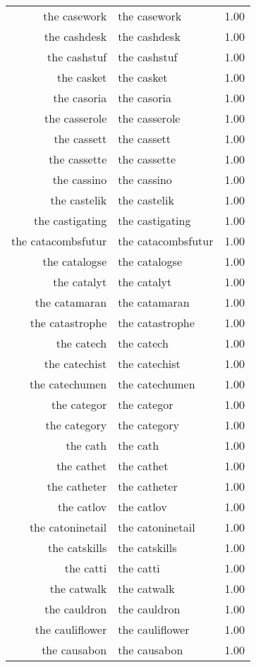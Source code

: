 \begin{table}[ht]
\begin{tabular}{rlr}
  the casework & the casework & 1.00 \\ 
  the cashdesk & the cashdesk & 1.00 \\ 
  the cashstuf & the cashstuf & 1.00 \\ 
  the casket & the casket & 1.00 \\ 
  the casoria & the casoria & 1.00 \\ 
  the casserole & the casserole & 1.00 \\ 
  the cassett & the cassett & 1.00 \\ 
  the cassette & the cassette & 1.00 \\ 
  the cassino & the cassino & 1.00 \\ 
  the castelik & the castelik & 1.00 \\ 
  the castigating & the castigating & 1.00 \\ 
  the catacombsfutur & the catacombsfutur & 1.00 \\ 
  the catalogse & the catalogse & 1.00 \\ 
  the catalyt & the catalyt & 1.00 \\ 
  the catamaran & the catamaran & 1.00 \\ 
  the catastrophe & the catastrophe & 1.00 \\ 
  the catech & the catech & 1.00 \\ 
  the catechist & the catechist & 1.00 \\ 
  the catechumen & the catechumen & 1.00 \\ 
  the categor & the categor & 1.00 \\ 
  the category & the category & 1.00 \\ 
  the cath & the cath & 1.00 \\ 
  the cathet & the cathet & 1.00 \\ 
  the catheter & the catheter & 1.00 \\ 
  the catlov & the catlov & 1.00 \\ 
  the catoninetail & the catoninetail & 1.00 \\ 
  the catskills & the catskills & 1.00 \\ 
  the catti & the catti & 1.00 \\ 
  the catwalk & the catwalk & 1.00 \\ 
  the cauldron & the cauldron & 1.00 \\ 
  the cauliflower & the cauliflower & 1.00 \\ 
  the causabon & the causabon & 1.00 \\ 

\end{tabular}
\end{table}
